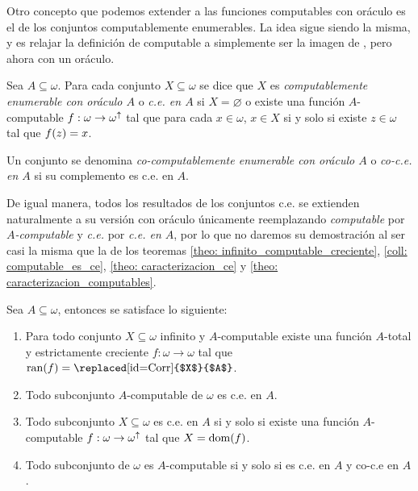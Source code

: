 \begin{agregado}
Otro concepto que podemos extender a las funciones computables con oráculo es el de los conjuntos computablemente enumerables. La idea sigue siendo la misma, y es relajar la definición de computable a simplemente ser la imagen de , pero ahora con un oráculo.

\begin{definition}
	\label{def: ce_relativos}
	Sea $A\subseteq\omega$. Para cada conjunto $X\subseteq\omega$ se dice que $X$ es \emph{computablemente enumerable con oráculo $A$} o \emph{c.e. en $A$} si $X =\varnothing$ o existe una función $A$-computable $f:\omega\to\omega^{\uparrow}$ tal que para cada $x\in\omega$, $x\in X$ si y solo si existe $z\in\omega$ tal que $f\pa*{z} = x$.

	Un conjunto se denomina \emph{co-computablemente enumerable con oráculo $A$} o \emph{co-c.e. en $A$} si su complemento es c.e. en $A$.
\end{definition}

De igual manera, todos los resultados de los conjuntos c.e. se extienden naturalmente a su versión con oráculo únicamente reemplazando \emph{computable} por \emph{$A$-computable} y \emph{c.e.} por \emph{c.e. en $A$}, por lo que no daremos su demostración al ser casi la misma que la de los teoremas \ref{theo: infinito_computable_creciente}, \ref{coll: computable_es_ce}, \ref{theo: caracterizacion_ce} y \ref{theo: caracterizacion_computables}.

\begin{theorem}
	\label{theo: ce_relativos}
	Sea $A\subseteq\omega$, entonces se satisface lo siguiente:
	\begin{enumerate}
		\item Para todo conjunto $X\subseteq\omega$ infinito y $A$-computable existe una función $A$-total y estrictamente creciente $f:\omega\to\omega$ tal que $\RANGO{f} =\mbox{\replaced[id=Corr]{$X$}{$A$}}$.
		\item Todo subconjunto $A$-computable de $\omega$ es c.e. en $A$.
		\item Todo subconjunto $X\subseteq\omega$ es c.e. en $A$ si y solo si existe una función $A$-computable $f:\omega\to\omega^{\uparrow}$ tal que $X =\DOMINIO{f}$.
		\item Todo subconjunto de $\omega$ es $A$-computable si y solo si es c.e. en $A$ y co-c.e en $A$.
	\end{enumerate}
\end{theorem}


\end{agregado}
